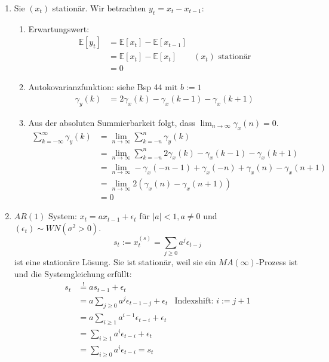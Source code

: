 \documentclass[a4paper,11pt,notitlepage,fullpage]{article}
\newcommand{\E}[1]{\mathbb E\left[#1\right]}
\begin{document}
\begin{enumerate}
\item Sie $(x_t)$ stationär. Wir betrachten $y_t = x_t - x_{t-1}$:
\begin{enumerate}
\item Erwartungswert:
\begin{align*}
\E{y_t} &= \E{x_t} - \E{x_{t-1}} \\
&= \E{x_t} - \E{x_t} &(x_t)\text{ stationär} \\
&= 0
\end{align*}
\item Autokovarianzfunktion: siehe Bsp 44 mit $b := 1$
\begin{align*}
\gamma_y(k) &= 2\gamma_x(k) - \gamma_x(k-1) - \gamma_x(k+1)
\end{align*}
\item Aus der absoluten Summierbarkeit folgt, dass $\lim_{n\to\infty}\gamma_x(n) = 0$.
\begin{align*}
\sum_{k = -\infty}^\infty \gamma_y(k) &= \lim_{n\to\infty} \sum_{k = -n}^n \gamma_y(k) \\
&= \lim_{n\to\infty} \sum_{k = -n}^n 2\gamma_x(k) - \gamma_x(k-1) - \gamma_x(k+1) \\
&= \lim_{n\to\infty} -\gamma_x (-n-1) + \gamma_x(-n) + \gamma_x(n) - \gamma_x(n+1) \\
&= \lim_{n\to\infty} 2 (\gamma_x(n) - \gamma_x(n+1)) \\
&= 0
\end{align*}
\end{enumerate}

\item $AR(1)$ System: $x_t = ax_{t-1} + \epsilon_t$ für $|a| < 1, a \neq 0$ und $(\epsilon_t) \sim WN(\sigma^2 > 0)$.
$$s_t := x_t^{(s)} = \sum_{j\geq0} a^j\epsilon_{t-j}$$
ist eine stationäre Lösung. Sie ist stationär, weil sie ein $MA(\infty)$-Prozess ist und die Systemgleichung erfüllt:
\begin{align*}
s_t &\stackrel{!}{=} a s_{t-1} + \epsilon_t \\
&= a \sum_{j\geq0} a^j\epsilon_{t-1-j} + \epsilon_t &\text{Indexshift: } i := j+1\\
&= a \sum_{i\geq1} a^{i-1}\epsilon_{t-i} + \epsilon_t \\
&= \sum_{i\geq1} a^i \epsilon_{t-i} + \epsilon_t \\
&= \sum_{i\geq0} a^i \epsilon_{t-i} = s_t
\end{align*}


\end{enumerate}
\end{document}

